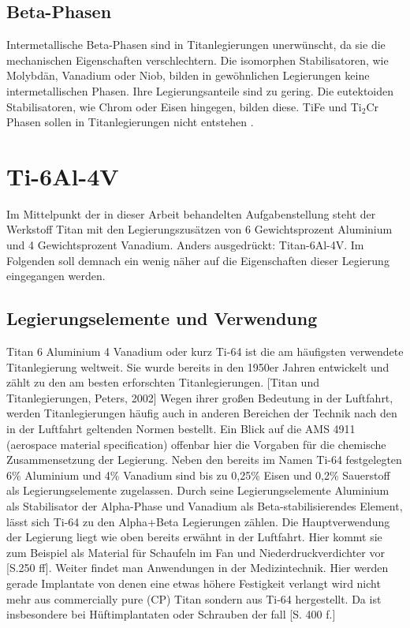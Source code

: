 \documentclass[a4paper, 11pt]{tubsreprt}
\begin{document}
\subsection{Beta-Phasen}
Intermetallische Beta-Phasen sind in Titanlegierungen unerwünscht, da sie die mechanischen Eigenschaften verschlechtern. Die isomorphen Stabilisatoren, wie Molybdän, Vanadium oder Niob, bilden in gewöhnlichen Legierungen keine intermetallischen Phasen. Ihre Legierungsanteile sind zu gering. Die eutektoiden Stabilisatoren, wie Chrom oder Eisen hingegen, bilden diese. TiFe und Ti$_{2}$Cr Phasen sollen in Titanlegierungen nicht entstehen \cite{Luetjering2007}.
\section{Ti-6Al-4V}
Im Mittelpunkt der in dieser Arbeit behandelten Aufgabenstellung steht der Werkstoff Titan mit den Legierungszusätzen von 6 Gewichtsprozent Aluminium und 4 Gewichtsprozent Vanadium. Anders ausgedrückt: Titan-6Al-4V. Im Folgenden soll demnach ein wenig näher auf die Eigenschaften dieser Legierung eingegangen werden. 
\subsection{Legierungselemente und Verwendung}
Titan 6 Aluminium 4 Vanadium oder kurz Ti-64 ist die am häufigsten verwendete Titanlegierung weltweit. Sie wurde bereits in den 1950er Jahren entwickelt und zählt zu den am besten erforschten Titanlegierungen. [Titan und Titanlegierungen, Peters, 2002] Wegen ihrer großen Bedeutung in der Luftfahrt, werden Titanlegierungen häufig auch in anderen Bereichen der Technik nach den in der Luftfahrt geltenden Normen bestellt. Ein Blick auf die AMS 4911 (aerospace material specification) offenbar hier die Vorgaben für die chemische Zusammensetzung der Legierung. Neben den bereits im Namen Ti-64 festgelegten 6\% Aluminium und 4\% Vanadium sind bis zu 0,25\% Eisen und 0,2\% Sauerstoff als Legierungselemente zugelassen. Durch seine Legierungselemente Aluminium als Stabilisator der Alpha-Phase und Vanadium als Beta-stabilisierendes Element, lässt sich Ti-64 zu den Alpha+Beta Legierungen zählen.
Die Hauptverwendung der Legierung liegt wie oben bereits erwähnt in der Luftfahrt. Hier kommt sie zum Beispiel als Material für Schaufeln im Fan und Niederdruckverdichter vor \cite{Luetjering2007}[S.250 ff]. Weiter findet man Anwendungen in der Medizintechnik. Hier werden gerade Implantate von denen eine etwas höhere Festigkeit verlangt wird nicht mehr aus commercially pure (CP) Titan sondern aus Ti-64 hergestellt. Da ist insbesondere bei Hüftimplantaten oder Schrauben der fall \cite{Luetjering2007}[S. 400 f.]
\end{document}
